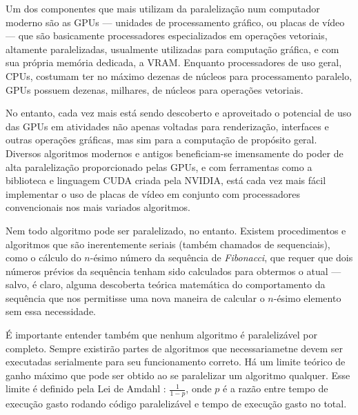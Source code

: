 \documentclass[12pt,
openright, 
oneside, %
a4paper,    %
brazil]{facom-ufu-abntex2}
\begin{document}

Um dos componentes que mais utilizam da paralelização num computador moderno são as GPUs --- unidades de processamento gráfico, ou placas de vídeo --- que são basicamente processadores especializados em operações vetoriais, altamente paralelizadas, usualmente utilizadas para computação gráfica, e com sua própria memória dedicada, a VRAM. Enquanto processadores de uso geral, CPUs, costumam ter no máximo dezenas de núcleos para processamento paralelo, GPUs possuem dezenas, milhares, de núcleos para operações vetoriais.

No entanto, cada vez mais está sendo descoberto e aproveitado o potencial de uso das GPUs em atividades não apenas voltadas para renderização, interfaces e outras operações gráficas, mas sim para a computação de propósito geral. Diversos algoritmos modernos e antigos beneficiam-se imensamente do poder de alta paralelização proporcionado pelas GPUs, e com ferramentas como a biblioteca e linguagem CUDA criada pela NVIDIA, está cada vez mais fácil implementar o uso de placas de vídeo em conjunto com processadores convencionais nos mais variados algoritmos.

Nem todo algoritmo pode ser paralelizado, no entanto. Existem procedimentos e algoritmos que são inerentemente seriais (também chamados de sequenciais), como o cálculo do $n$-ésimo número da sequência de \textit{Fibonacci}, que requer que dois números prévios da sequência tenham sido calculados para obtermos o atual --- salvo, é claro, alguma descoberta teórica matemática do comportamento da sequência que nos permitisse uma nova maneira de calcular o $n$-ésimo elemento sem essa necessidade.

É importante entender também que nenhum algoritmo é paralelizável por completo. Sempre existirão partes de algoritmos que necessariametne devem ser executadas serialmente para seu funcionamento correto. Há um limite teórico de ganho máximo que pode ser obtido ao se paralelizar um algoritmo qualquer. Esse limite é definido pela Lei de Amdahl \cite{Amdahl-Law}: $\frac{1}{1-p}$, onde $p$ é a razão entre tempo de execução gasto rodando código paralelizável e tempo de execução gasto no total.

\end{document}
